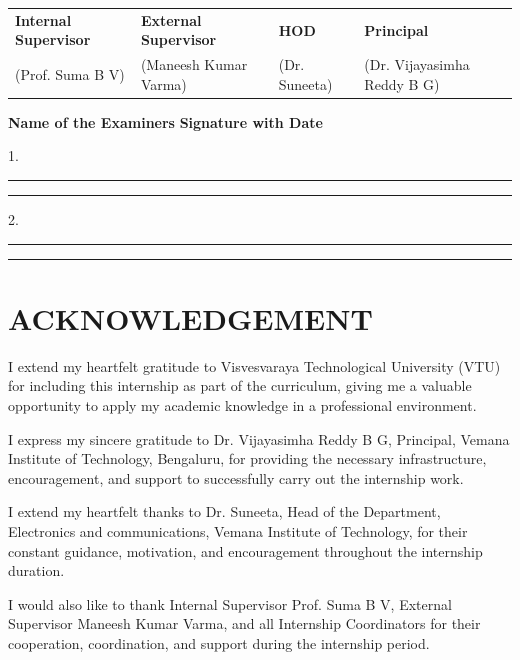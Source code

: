 \documentclass[12pt,a4paper]{report}
\begin{document}
\vspace{0.6cm}
\begin{center}
\begin{tabular}{p{} p{} p{} p{}}
\textbf{Internal Supervisor} & \textbf{External Supervisor} & \textbf{HOD} & \textbf{Principal} \\
(Prof. Suma B V) & (Maneesh Kumar Varma) & (Dr. Suneeta) & (Dr. Vijayasimha Reddy B G) \\
\end{tabular}
\end{center}

\vspace{0.5cm}
\textbf{Name of the Examiners} \hfill \textbf{Signature with Date}\par
\vspace{0.2cm}
1.\enspace\rule{5cm}{0.4pt} \hfill \rule{3.5cm}{0.4pt}\par
\vspace{0.4cm}
2.\enspace\rule{5cm}{0.4pt} \hfill \rule{3.5cm}{0.4pt}\par



\newpage
\chapter*{ACKNOWLEDGEMENT}

I extend my heartfelt gratitude to Visvesvaraya Technological University (VTU) for including this internship as part of the curriculum, giving me a valuable opportunity to apply my academic knowledge in a professional environment.

I express my sincere gratitude to Dr. Vijayasimha Reddy B G, Principal, Vemana Institute of Technology, Bengaluru, for providing the necessary infrastructure, encouragement, and support to successfully carry out the internship work.

I extend my heartfelt thanks to Dr. Suneeta, Head of the Department, Electronics and communications, Vemana Institute of Technology, for their constant guidance, motivation, and encouragement throughout the internship duration.

I would also like to thank Internal Supervisor Prof. Suma B V, External Supervisor Maneesh Kumar Varma, and all Internship Coordinators for their cooperation, coordination, and support during the internship period.
\end{document}
